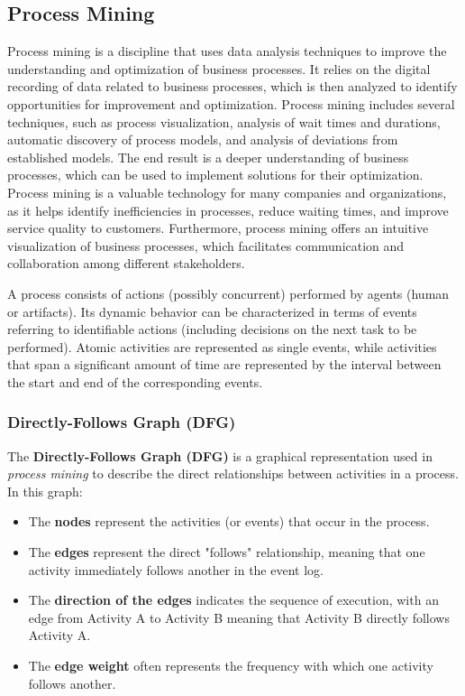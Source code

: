 \subsection{Process Mining}
Process mining is a discipline that uses data analysis techniques to improve the understanding and optimization of business processes. It relies on the digital recording of data related to business processes, which is then analyzed to identify opportunities for improvement and optimization. Process mining includes several techniques, such as process visualization, analysis of wait times and durations, automatic discovery of process models, and analysis of deviations from established models. The end result is a deeper understanding of business processes, which can be used to implement solutions for their optimization. Process mining is a valuable technology for many companies and organizations, as it helps identify inefficiencies in processes, reduce waiting times, and improve service quality to customers. Furthermore, process mining offers an intuitive visualization of business processes, which facilitates communication and collaboration among different stakeholders.

A process consists of actions (possibly concurrent) performed by agents (human or artifacts). Its dynamic behavior can be characterized in terms of events referring to identifiable actions (including decisions on the next task to be performed). Atomic activities are represented as single events, while activities that span a significant amount of time are represented by the interval between the start and end of the corresponding events. 

\subsubsection{Directly-Follows Graph (DFG)}

The \textbf{Directly-Follows Graph (DFG)} is a graphical representation used in \textit{process mining} to describe the direct relationships between activities in a process. In this graph:
\begin{itemize}
    \item The \textbf{nodes} represent the activities (or events) that occur in the process.
    \item The \textbf{edges} represent the direct "follows" relationship, meaning that one activity immediately follows another in the event log.
    \item The \textbf{direction of the edges} indicates the sequence of execution, with an edge from Activity A to Activity B meaning that Activity B directly follows Activity A.
    \item The \textbf{edge weight} often represents the frequency with which one activity follows another.
\end{itemize}

